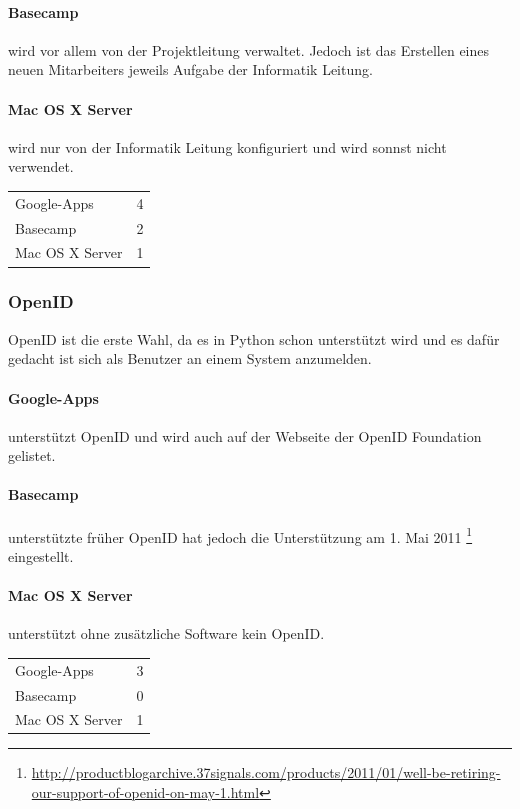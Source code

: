\paragraph{Basecamp}
\label{par:1.3Basecamp}
wird vor allem von der Projektleitung verwaltet. Jedoch ist das Erstellen eines
neuen Mitarbeiters jeweils Aufgabe der Informatik Leitung.
\paragraph{Mac OS X Server}
\label{par:1.3Mac OS X Server}
wird nur von der Informatik Leitung konfiguriert und wird sonnst nicht
verwendet.

\begin{tabular}{lc}
Google-Apps & 4\\
Basecamp & 2\\
Mac OS X Server & 1\\
\end{tabular}

\subsubsection{OpenID}
\label{ssub:Bewertung OpenID}
OpenID ist die erste Wahl, da es in Python schon unterstützt wird und es dafür
gedacht ist sich als Benutzer an einem System anzumelden.
\paragraph{Google-Apps}
\label{par:2.1Google-Apps}
unterstützt OpenID und wird auch auf der Webseite der OpenID Foundation
gelistet.
\paragraph{Basecamp}
\label{par:2.1Basecamp}
unterstützte früher OpenID hat jedoch die Unterstützung am 1. Mai 2011
\footnote{\url{http://productblogarchive.37signals.com/products/2011/01/well-be-retiring-our-support-of-openid-on-may-1.html}}
eingestellt.
\paragraph{Mac OS X Server}
\label{par:2.1Mac OS X Server}
unterstützt ohne zusätzliche Software kein OpenID.

\begin{tabular}{lc}
Google-Apps & 3\\
Basecamp & 0\\
Mac OS X Server & 1\\
\end{tabular}

